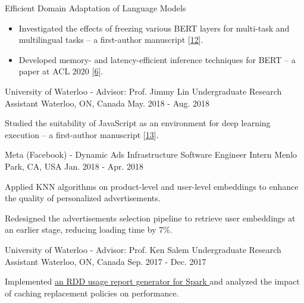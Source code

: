 \begin{cventries}
{\begin{cvitems}
\begin{itemize}[label=$\cdot$,leftmargin=0.7em]
\end{itemize}
\item {Efficient Domain Adaptation of Language Models}
\begin{itemize}[label=$\cdot$,leftmargin=0.7em]
\item {Investigated the effects of freezing various BERT layers for multi-task and multilingual tasks -- a first-author manuscript [\hyperlink{Elsa:arXiv}{12}].}
\item {Developed memory- and latency-efficient inference techniques for BERT -- a paper at ACL 2020 [\hyperlink{DeeBERT:ACL}{6}].}
\end{itemize}
\end{cvitems}
}
\cventry
{University of Waterloo - Advisor: Prof. Jimmy Lin} %
{Undergraduate Research Assistant} %
{Waterloo, ON, Canada} %
{May. 2018 - Aug. 2018} %
{ %
\begin{cvitems}
\item {Studied the suitability of JavaScript as an environment for deep learning execution -- a first-author manuscript [\hyperlink{JavaScript:arXiv}{13}].}
\end{cvitems}
}
\cventry
{Meta (Facebook) - Dynamic Ads Infrastructure} %
{Software Engineer Intern} %
{Menlo Park, CA, USA} %
{Jan. 2018 - Apr. 2018} %
{ %
\begin{cvitems}
\item {Applied KNN algorithms on product-level and user-level embeddings to enhance the quality of personalized advertisements.}
\item {Redesigned the advertisements selection pipeline to retrieve user embeddings at an earlier stage, reducing loading time by 7\%.}
\end{cvitems}
}
\cventry
{University of Waterloo - Advisor: Prof. Ken Salem} %
{Undergraduate Research Assistant} %
{Waterloo, ON, Canada} %
{Sep. 2017 - Dec. 2017} %
{ %
\begin{cvitems}
\item {Implemented \href{https://github.com/ljj7975/CachedRDDReportGenerator}{an RDD usage report generator for Spark {\small \faGithub}} and analyzed the impact of caching replacement policies on performance.}

\end{cvitems}}
\end{cventries}
